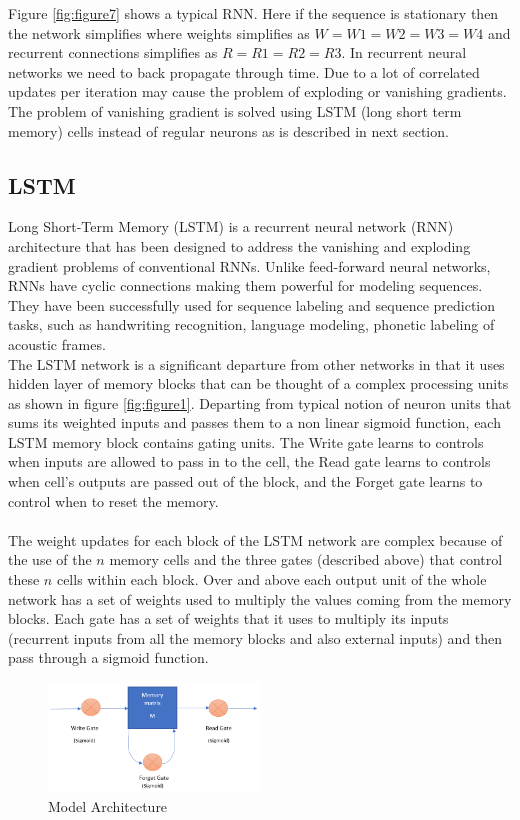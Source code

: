\documentclass[conference]{IEEEtran}
\begin{document}
Figure \ref{fig:figure7} shows a typical RNN. Here if the sequence is stationary then the network simplifies where weights simplifies as $W = W1 = W2 = W3 = W4$ and recurrent connections simplifies as $R = R1 = R2 = R3$.
In recurrent neural networks we need to back propagate through time. Due to a lot of correlated updates per iteration may cause the problem of exploding or vanishing gradients. The problem of vanishing gradient is solved using LSTM (long short term memory) cells instead of regular neurons as is described in next section.

\subsection{LSTM}
Long Short-Term Memory (LSTM) is a recurrent neural network (RNN) architecture that has been designed to address the vanishing and exploding gradient problems of conventional RNNs. Unlike feed-forward neural networks, RNNs have cyclic connections making them powerful for modeling sequences. They have been successfully used for sequence labeling and sequence prediction tasks, such as handwriting recognition, language modeling, phonetic labeling of acoustic frames. \cite{lstm}\\
The LSTM network is a significant departure from other networks in that it uses hidden layer of memory blocks that can be thought of a complex processing units as shown in figure \ref{fig:figure1}. Departing from typical notion of neuron units that sums its weighted inputs and passes them to a non linear sigmoid function, each LSTM memory block contains gating units. The Write gate learns to controls when inputs are allowed to pass in to the cell, the Read gate learns to controls when cell's outputs are passed out of the block, and the Forget gate learns to control when to reset the memory.\\
\\The weight updates for each block of the LSTM network are complex because of the use of the $n$ memory cells and the three gates (described above) that control these $n$ cells within each block. Over and above each output unit of the whole network has a set of weights used to multiply the values coming from the memory blocks. Each gate has a set of weights that it uses to multiply its inputs (recurrent inputs from all the memory blocks and also external inputs) and then pass through a sigmoid function. \cite{judy}

\begin{figure}[h]
\includegraphics[width=0.5\textwidth]{3.PNG}
\caption{Model Architecture}
\label{fig:figure8}
\end{figure}
\end{document}
